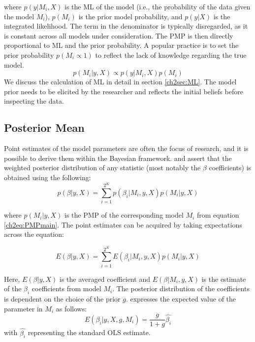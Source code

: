 where $p(y\vert M_{i},X)$ is the \ac{ML} of the model (i.e., the probability of the data given the model $M_{i}$), $p(M_{i})$ is the prior model probability, and $p(y\vert X)$ is the integrated likelihood. The term in the denominator is typically disregarded, as it is constant across all models under consideration. The PMP is then directly proportional to \ac{ML} and the prior probability. A popular practice is to set the prior probability $p(M_{i} \propto 1)$ to reflect the lack of knowledge regarding the true model.
\begin{equation}
	p(M_{i}\vert y,X) \propto p(y\vert M_{i},X)p(M_{i})
\end{equation}
%
We discuss the calculation of \ac{ML} in detail in section \ref{ch2sec:ML}. The model prior needs to be elicited by the researcher and reflects the initial beliefs before inspecting the data. 
%
\subsection{Posterior Mean}
Point estimates of the model parameters are often the focus of research, and it is possible to derive them within the Bayesian framework. \citet{Zeugner2011} and \citet{MoralBenito2012} assert that the weighted posterior distribution of any statistic (most notably the $\beta$ coefficients) is obtained using the following:
%
\begin{equation}\label{ch2eq:parest}
	p(\beta \vert y, X) = \sum_{i=1}^{2^{K}} p(\beta_{i} \vert M_{i},y,X)p(M_{i} \vert y,X)
\end{equation}

where $p(M_{i} \vert y, X)$ is the \ac{PMP} of the corresponding model $M_{i}$ from equation \ref{ch2eq:PMPmain}. The point estimates can be acquired by taking expectations across the equation:

\begin{equation}\label{ch2eq:pointparest}
	E(\beta \vert y, X) = \sum_{i=1}^{2^{K}} E(\beta_{i} \vert M_{i},y,X)p(M_{i} \vert y,X)
\end{equation}

Here, $E(\beta \vert y, X)$ is the averaged coefficient and $E(\beta \vert M_{i},y,X)$ is the estimate of the $\beta_{i}$ coefficients from model $M_{i}$. The posterior distribution of the coefficients is dependent on the choice of the prior $g$. \citet{Zeugner2011} expresses the expected value of the parameter in $M_{i}$ as follows:
\begin{equation}\label{ch2eq:postdist}
	E(\beta_{i} \vert y,X,g,M_{i}) = \frac{g}{1+g}\hat{\beta_{i}}
\end{equation}
with $\hat{\beta_{i}}$ representing the standard \ac{OLS} estimate.

